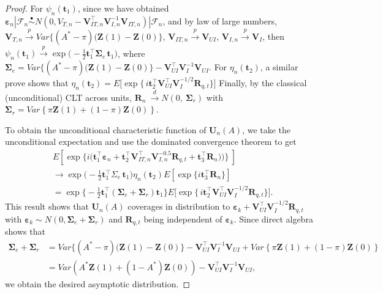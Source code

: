 \documentclass[12pt]{article}
\newcommand{\bZ}{\boldsymbol{Z}}
\newcommand{\bU}{\boldsymbol{U}}
\newcommand{\bR}{\boldsymbol{R}}
\newcommand{\bV}{\boldsymbol{V}}
\newcommand{\bt}{\boldsymbol{t}}
\newcommand{\bSigma}{\mathbf{\Sigma}}
\newcommand{\bvarepsilon}{\boldsymbol{\varepsilon}}
\begin{document}
\begin{proof}
For $\psi_{n}(\bt_1)$, since we have obtained $\bvarepsilon_n | \mathcal{F}_n \overset{\bullet}{\sim} N(0, V_{T,n} - \bV_{IT,n}^\top \bV_{I,n}^{-1}\bV_{IT,n}) | \mathcal{F}_n$, and by law of large numbers, $\bV_{T,n} \xrightarrow{p} Var\{(A^*-\pi)(\bZ(1)-\bZ(0)\}$, $\bV_{IT,n} \xrightarrow{p} \bV_{UI}$, $\bV_{I,n} \xrightarrow{p} \bV_I$, then $\psi_{n}(\bt_1) \xrightarrow{p} \exp\!\Big(-\tfrac12 \bt_1^\top \bSigma_e\, \bt_1\Big)$, where  $\bSigma_e = Var\{(A^*-\pi)(\bZ(1)-\bZ(0)\} - \bV_{UI}^\top \bV_I^{-1} \bV_{UI}$.
For $\eta_n(\bt_2)$, a similar prove shows that $\eta_n(\bt_2) = E\!\big[\exp\{\,i \bt_2^\top \bV_{UI}^\top \bV_I^{-1/2} \bR_{q,t}\}\big]$
Finally, by the classical (unconditional) CLT across units,
$\bR_n\ \xrightarrow{d}  N(0,\ \bSigma_r)$ with $\bSigma_r = Var\left\{\pi \bZ(1) + (1-\pi) \bZ(0)\right\}$.

To obtain the unconditional characteristic function of $\bU_n(A)$, we take the unconditional expectation and use the dominated convergence theorem to get
\begin{align*}
    & E\!\left[\exp\!\Big\{i\big(\bt_1^\top \bvarepsilon_n
+ \bt_2^\top \bV_{IT,n}^\top   \bV_{I,n}^{-0.5} \bR_{q,t}  + \bt_3^\top \bR_n)\big)\Big\}\ \right]\\
&\rightarrow \exp\!\Big(-\tfrac12 \bt_1^\top \Sigma_e\, \bt_1\Big) \eta_n(\bt_2) E[\exp\{i\bt_3^\top \bR_n\}] \\
&= \exp\!\Big\{-\tfrac12 \bt_1^\top (\bSigma_e +\bSigma_r) \bt_1\Big\} E\!\big[\exp\{\,i \bt_2^\top \bV_{UI}^\top \bV_I^{-1/2} \bR_{q,t}\}\big].
\end{align*}
This result shows that $\bU_n(A)$ coverages in distribution to $\bvarepsilon_k + \bV_{UI}^\top \bV_I^{-1/2} \bR_{q,t}$ with $\bvarepsilon_k \sim N(0, \bSigma_e +\bSigma_r)$ and $\bR_{q,t}$ being independent  of $\bvarepsilon_k$. 
Since direct algebra shows that 
\begin{align*}
    \bSigma_e +\bSigma_r &= Var\{(A^*-\pi)(\bZ(1)-\bZ(0)\} - \bV_{UI}^\top \bV_I^{-1} \bV_{UI} + Var\left\{\pi \bZ(1) + (1-\pi) \bZ(0)\right\} \\
    &= Var(A^* \bZ(1) + (1-A^*) \bZ(0)) - \bV_{UI}^\top \bV_I^{-1} \bV_{UI},
\end{align*}
we obtain the desired asymptotic distribution.
\end{proof}
\end{document}
